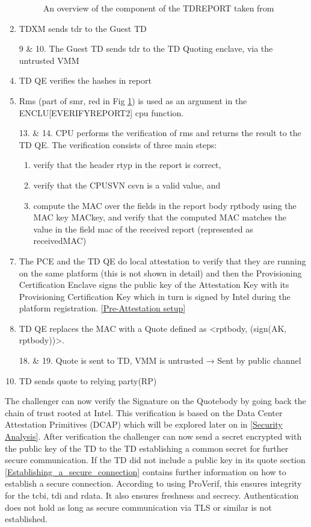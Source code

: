 \begin{enumerate}
\begin{figure}
\caption{An overview of the component of the TDREPORT taken from \cite{sardar_demystifying_2021}}
\label{fig:tdr}
\end{figure}
\item TDXM sends tdr to the Guest TD
\item[9 \& 10.]The Guest TD sends tdr to the TD Quoting enclave, via the untrusted VMM
\item TD QE verifies the hashes in report
\item Rms (part of smr, red in Fig \ref{fig:tdr}) is used as an argument in the ENCLU[EVERIFYREPORT2] cpu function. 
\item[13. \& 14.] CPU performs the verification of rms and returns the result to the TD QE. The verification consists of three main steps: 
\begin{enumerate}
\item verify that the header rtyp in the report is correct, 
\item verify that the CPUSVN csvn is a valid value, and 
\item compute the MAC over the fields in the report body rptbody using the MAC key MACkey, and verify that the computed MAC matches the value in the field mac of the received report (represented as receivedMAC)
\end{enumerate}
\item The PCE and the TD QE do local attestation to verify that they are running on the same platform (this is not shown in detail) and then the Provisioning Certification Enclave signs the public key of the Attestation Key with its Provisioning Certification Key which in turn is signed by Intel during the platform registration. 
\ref{Pre-Attestation setup}
\item TD QE replaces the MAC with a Quote defined as <rptbody, (sign(AK, rptbody))>.
\item[18. \& 19.] Quote is sent to TD, VMM is untrusted → Sent by public channel
\item TD sends quote to relying party(RP)
\end{enumerate}
The challenger can now verify the Signature on the Quotebody by going back the chain of trust rooted at Intel. This verification is based on the Data Center Attestation Primitives (DCAP) which will be explored later on in \ref{Security Analysis}. After verification the challenger can now send a secret encrypted with the public key of the TD to the TD establishing a common secret for further secure communication. If the TD did not include a public key in its quote section \ref{Establishing_a_secure_connection} contains further information on how to establish a secure connection. According to \cite{sardar_formal_2023} using ProVerif, this ensures integrity for the tcbi, tdi and rdata. It also ensures freshness and secrecy. Authentication does not hold as long as secure communication via TLS or similar is not established.

